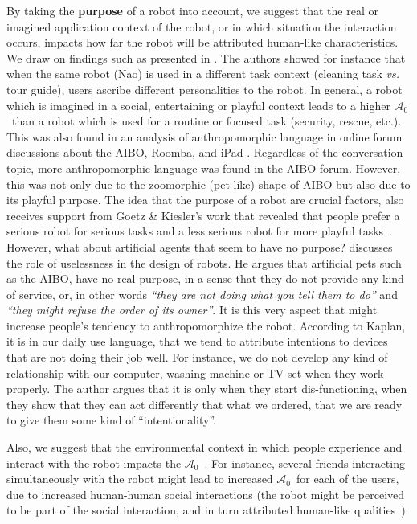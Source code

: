 \documentclass{frontiersSCNS} %
\newcommand{\ICA}{{$\mathcal{A}_0$~}}
\begin{document}
By taking the \textbf{purpose} of a robot into account, we suggest that the real
or imagined application context of the robot, or in which situation the
interaction occurs, impacts how far the robot will be attributed human-like
characteristics. We draw on findings such as presented in
\citet{joosse_what_2013}. The authors showed for instance that when the same
robot (Nao) is used in a different task context (cleaning task \emph{vs.} tour
guide), users ascribe different personalities to the robot. In general, a robot
which is imagined in a social, entertaining or playful context leads to a higher
\ICA than a robot which is used for a routine or focused task (security, rescue,
etc.). This was also found in an analysis of anthropomorphic language in online
forum discussions about the AIBO, Roomba, and iPad
\citep{fink_anthropomorphic_2012}. Regardless of the conversation topic, more
anthropomorphic language was found in the AIBO forum. However, this was not only
due to the zoomorphic (pet-like) shape of AIBO but also due to its  playful
purpose. The idea that the purpose of a robot are crucial factors, also receives
support from Goetz \& Kiesler's work that revealed that people prefer a serious
robot for serious tasks and a less serious robot for more playful
tasks~\citep{goetz_cooperation_2002, goetz_matching_2003}.  However, what about
artificial agents that seem to have no purpose? \cite{kaplan_free_2000}
discusses the role of uselessness in the design of robots. He argues that
artificial pets such as the AIBO, have no real purpose, in a sense that they do
not provide any kind of service, or, in other words \textit{``they are not doing
what you tell them to do''} and \textit{``they might refuse the order of its
owner''}. It is this very aspect that might increase people's tendency to
anthropomorphize the robot. According to Kaplan, it is in our daily use
language, that we tend to attribute intentions to devices that are not doing
their job well. For instance, we do not develop any kind of relationship with
our computer, washing machine or TV set when they work properly. The author
argues that it is only when they start dis-functioning, when they show that they
can act differently that what we ordered, that we are ready to give them some
kind of ``intentionality''.

Also, we suggest that the environmental context in which people experience and
interact with the robot impacts the \ICA. For instance, several friends
interacting simultaneously with the robot might lead to increased \ICA for each
of the users, due to increased human-human social interactions (the robot might
be perceived to be part of the social interaction, and in turn attributed
human-like qualities~\citep{baxter2013do}).
\end{document}
